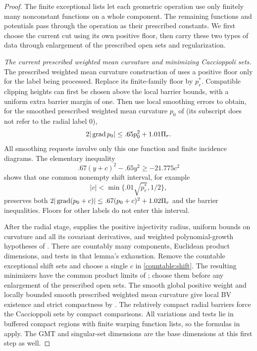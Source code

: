\begin{proof}
The finite exceptional lists let each geometric operation use only
finitely many nonconstant functions on a whole component. The remaining
functions and potentials pass through the operation as their prescribed
constants. We first choose the current cut using its own positive floor,
then carry these two types of data through enlargement of the prescribed open sets and regularization.

\emph{The current prescribed weighted mean curvature and minimizing Caccioppoli sets.}
The prescribed weighted mean curvature construction of  uses a positive floor
only for the label being processed. Replace its finite-family floor
by $p_r^*$. Compatible clipping heights can first be chosen above the
local barrier bounds, with a uniform extra barrier margin of one.
Then use local smoothing errors to obtain, for the smoothed prescribed weighted mean curvature
$p_0$ of  (its subscript does not refer to the radial
label $0$),
\[
 2|\operatorname{grad} p_0|\le .65p_0^2+1.01\Pi_r.
\]
All smoothing requests involve only this one function and finite
incidence diagrams. The elementary inequality
\[
 .67(y+c)^2-.65y^2\ge-21.775c^2
\]
shows that one common nonempty shift interval, for example
\begin{equation}\label{countable:shift}
 |c|<\min\{.01\sqrt{p_r^*},1/2\},
\end{equation}
preserves both $2|\operatorname{grad}(p_0+c)|\le .67(p_0+c)^2+1.02\Pi_r$ and
the barrier inequalities. Floors for other labels do not enter this
interval.

After the radial stage,  supplies the positive injectivity radius, uniform bounds on curvature and
all its covariant derivatives, and weighted polynomial-growth hypotheses of
. There are countably many components,
Euclidean product dimensions, and tests in that lemma's exhaustion.
Remove the countable exceptional shift sets and choose a single $c$
in \eqref{countable:shift}. The resulting minimizers have the
common product limits of ; choose them before
any enlargement of the prescribed open sets. The smooth global
positive weight and locally bounded smooth prescribed weighted mean curvature give local BV
existence and strict compactness by . The
relatively compact radial barriers force the Caccioppoli sets by compact
comparisons. All variations and tests lie in buffered compact regions
with finite warping function lists, so the formulas in 
apply. The GMT and singular-set dimensions are the base dimensions at
this first step as well.


\end{proof}
